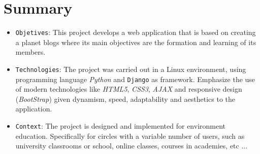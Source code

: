 \documentclass[a4paper, 12pt]{book}
\begin{document}

\chapter*{Summary}
\begin{itemize}
  \item \texttt{Objetives}: This project develops a web application that is based on creating a planet blogs where its main objectives are the formation and learning
  of its members.
  
  \item \texttt{Technologies}: The project was carried out in a Linux environment, using programming language \textit{Python} and \texttt{Django} as framework. Emphasize the use of modern 
  technologies like \textit{HTML5}, \textit{CSS3}, \textit{AJAX} and responsive design (\textit{BootStrap}) given dynamism, speed, adaptability and aesthetics to the application.

  \item \texttt{Context}: The project is designed and implemented for environment education. Specifically for circles with a variable number of users, such as university 
  classrooms or school, online classes, courses in academies, etc ...
\end{itemize}




\tableofcontents 
\cleardoublepage
{}
{} %
\listoffigures %


\end{document}
